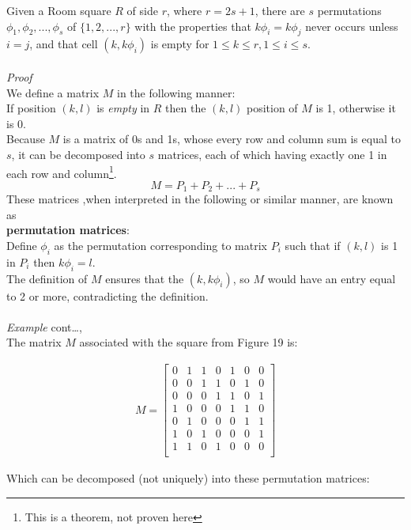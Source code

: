 \documentclass[
  12pt,
  a4paper]{book}
\begin{document}
Given a Room square \(R\) of side \(r\), where \(r=2s+1\), there are \(s\)
permutations \(\phi_1,\phi_2,...,\phi_s\) of \(\{1,2,...,r\}\) with the
properties that \(k\phi_i=k\phi_j\) never occurs unless \(i=j\), and that
cell \((k,k\phi_i)\) is empty for \(1 \leq k \leq r, 1 \leq i\leq s\).\\
~\\
\emph{Proof}\\
We define a matrix \(M\) in the following manner:\\
If position \((k,l)\) is \emph{empty} in \(R\) then the \((k,l)\) position of \(M\)
is 1, otherwise it is 0.\\
Because \(M\) is a matrix of 0s and 1s, whose every row and column sum is
equal to \(s\), it can be decomposed into \(s\) matrices, each of which
having exactly one 1 in each row and column\footnote{This is a theorem, not proven here}. \[M=P_1+P_2+...+P_s\]
These matrices ,when interpreted in the following or similar manner, are
known as\\
\textbf{permutation matrices}:\\
Define \(\phi_i\) as the permutation corresponding to matrix \(P_i\) such
that if \((k,l)\) is 1 in \(P_i\) then \(k\phi _i=l\).\\
The definition of \(M\) ensures that the \((k,k\phi _i)\), so \(M\) would have
an entry equal to 2 or more, contradicting the definition.\\
~\\
\emph{Example} cont\ldots,\\
The matrix \(M\) associated with the square from Figure 19 is:

\[\begin{gathered}
M=
  \begin{bmatrix}
  0 & 1 & 1 & 0 & 1 & 0 & 0\\
  0 & 0 & 1 & 1 & 0 & 1 & 0\\
  0 & 0 & 0 & 1 & 1 & 0 & 1\\
  1 & 0 & 0 & 0 & 1 & 1 & 0\\
  0 & 1 & 0 & 0 & 0 & 1 & 1\\
  1 & 0 & 1 & 0 & 0 & 0 & 1\\
  1 & 1 & 0 & 1 & 0 & 0 & 0\\
  \end{bmatrix}\end{gathered}\]

Which can be decomposed (not uniquely) into these permutation matrices:
\end{document}
